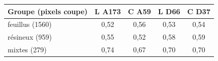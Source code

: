 \begin{tabular}{lcccc}
\toprule
Groupe (pixels coupe) & L A173 & C A59 & L D66 & C D37 \\
\midrule
feuillus (1560) & 0{,}52 & 0{,}56 & 0{,}53 & 0{,}54 \\
résineux (959) & 0{,}55 & 0{,}52 & 0{,}58 & 0{,}59 \\
mixtes (279) & 0{,}74 & 0{,}67 & 0{,}70 & 0{,}70 \\
\bottomrule
\end{tabular}
